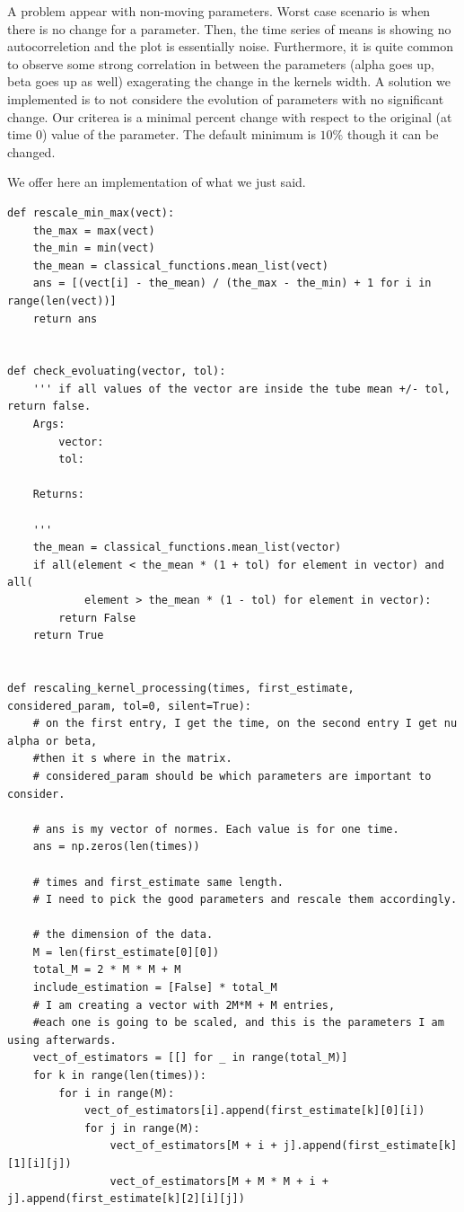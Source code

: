 \documentclass[11pt]{book}
\begin{document}
A problem appear with non-moving parameters. Worst case scenario is when there is no change for a parameter. Then, the time series of means is showing no autocorreletion and the plot is essentially noise. Furthermore, it is quite common to observe some strong correlation in between the parameters (alpha goes up, beta goes up as well) exagerating the change in the kernels width. A solution we implemented is to not considere the evolution of parameters with no significant change. Our criterea is a minimal percent change with respect to the original (at time 0) value of the parameter. The default minimum is $10\%$ though it can be changed.


We offer here an implementation of what we just said. 

\begin{verbatim}
def rescale_min_max(vect):
    the_max = max(vect)
    the_min = min(vect)
    the_mean = classical_functions.mean_list(vect)
    ans = [(vect[i] - the_mean) / (the_max - the_min) + 1 for i in range(len(vect))]
    return ans


def check_evoluating(vector, tol):
    ''' if all values of the vector are inside the tube mean +/- tol, return false.
    Args:
        vector:
        tol:

    Returns:

    '''
    the_mean = classical_functions.mean_list(vector)
    if all(element < the_mean * (1 + tol) for element in vector) and all(
            element > the_mean * (1 - tol) for element in vector):
        return False
    return True


def rescaling_kernel_processing(times, first_estimate, considered_param, tol=0, silent=True):
    # on the first entry, I get the time, on the second entry I get nu alpha or beta, 
    #then it s where in the matrix.
    # considered_param should be which parameters are important to consider.

    # ans is my vector of normes. Each value is for one time.
    ans = np.zeros(len(times))

    # times and first_estimate same length.
    # I need to pick the good parameters and rescale them accordingly.

    # the dimension of the data.
    M = len(first_estimate[0][0])
    total_M = 2 * M * M + M
    include_estimation = [False] * total_M
    # I am creating a vector with 2M*M + M entries,
    #each one is going to be scaled, and this is the parameters I am using afterwards.
    vect_of_estimators = [[] for _ in range(total_M)]
    for k in range(len(times)):
        for i in range(M):
            vect_of_estimators[i].append(first_estimate[k][0][i])
            for j in range(M):
                vect_of_estimators[M + i + j].append(first_estimate[k][1][i][j])
                vect_of_estimators[M + M * M + i + j].append(first_estimate[k][2][i][j])


\end{verbatim}
\end{document}
